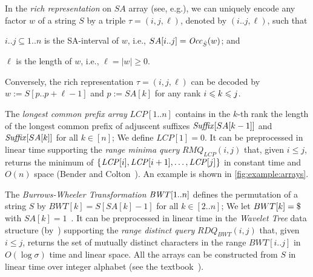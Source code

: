 In the \textit{rich representation} on $SA$ array (see, e.g.\cite{kasai:lee2001lcp:linear,abouelhoda2004replacing}), we can uniquely encode any factor $w$ of a string $S$ by a triple $\tau = (i, j, \ell)$, denoted by $(i..j, \ell)$, such that
\begin{enumerate*}[(i)]
\item $i..j \subseteq 1..n$ is the SA-interval of $w$, i.e., $SA[i..j] = \Occ(w)$; and  
\item $\ell$ is the length of $w$, i.e., $\ell = |w|\ge 0$. 
\end{enumerate*}
Conversely, the rich representation $\tau = (i, j, \ell)$ can be decoded by $w := S[p..p+\ell-1]$ and $p := SA[k]$ for any rank $\btw kij$. 


The \textit{longest common prefix array} $LCP[1..n]$ contains in the $k$-th rank the length of the longest common prefix of adjuscent suffixes $\Suf[SA[k-1]]$ and $\Suf[SA[k]]$ for all $k \in [n]$; We define $LCP[1] = 0$. It can be preprocessed in linear time supporting the \textit{range minima query} $RMQ_{LCP}(i, j)$ that, given $i\le j$, returns the minimum of $\set{\LCP[i], \LCP[i+1], \dots, \LCP[j]}$ in constant time and $O(n)$ space (Bender and Colton~\cite{bender:colton2000thelcaproblem}).
An example is shown in \cref{fig:example:arrays}. 

The \textit{Burrows-Wheeler Transformation} $\BWT[1..n]$ defines the permutation of a string $S$ by $BWT[k] = S[SA[k]-1]$ for all $k \in [2..n]$; We let $BWT[k] = \daller$ with $SA[k] = 1$~\cite{burrows:wheeler1994blocksorting}. 
It can be preprocessed in linear time in the \textit{Wavelet Tree} data structure (by~\cite{grossi2003high}) supporting the \textit{range distinct query} $RDQ_{BWT}(i, j)$ that, given $i\le j$, returns the set of mutually distinct characters in the range $BWT[i..j]$ in $O(\log\sigma)$ time and
linear space. 
All the arrays can be constructed from $S$ in linear time over integer alphabet (see the textbook~\cite{navarro2016cds:book}). 


